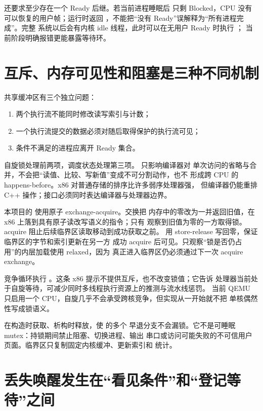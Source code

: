  还要求至少存在一个 Ready 后继。若当前进程睡眠后
只剩 Blocked，CPU 没有可以恢复的用户帧；运行时返回
，不能把“没有 Ready”误解释为“所有进程完成”。完整
系统以后会有内核 idle 线程，此时可以在无用户 Ready 时执行 ；
当前阶段明确报错更能暴露等待环。

\section{互斥、内存可见性和阻塞是三种不同机制}

共享缓冲区有三个独立问题：

\begin{enumerate}[label=\arabic*.]
  \item 两个执行流不能同时修改读写索引与计数；
  \item 一个执行流提交的数据必须对随后取得保护的执行流可见；
  \item 条件不满足的进程应离开 Ready 集合。
\end{enumerate}

自旋锁处理前两项，调度状态处理第三项。 只影响编译器对
单次访问的省略与合并，不会把“读值、比较、写新值”变成不可分割动作，也不
形成跨 CPU 的 happens-before。x86 对普通存储的排序比许多弱序处理器强，
但编译器仍能重排 C++ 操作；接口必须同时表达编译器与处理器边界。

本项目的  使用原子 exchange-acquire。交换把
内存中的零改为一并返回旧值，在 x86 上落到具有原子读改写语义的指令；只有
观察到旧值为零的一方取得锁。acquire 阻止后续临界区读取移动到成功获取之前。
 用 store-release 写回零，保证临界区的字节和索引更新在另一方
成功 acquire 后可见。只观察“锁是否仍占用”的内层加载使用 relaxed，因为
真正进入临界区仍必须通过下一次 acquire exchange。

竞争循环执行 。这条 x86 提示不提供互斥，也不改变锁值；它告诉
处理器当前处于自旋等待，可减少同时多线程执行资源上的推测与流水线惩罚。
当前 QEMU 只启用一个 CPU，自旋几乎不会承受跨核竞争，但实现从一开始就不把
单核偶然性写成锁语义。

 在构造时获取、析构时释放，使  的多个
早退分支不会漏锁。它不是可睡眠 mutex：持锁期间禁止阻塞、切换进程、输出
串口或访问可能失败的不可信用户页面。临界区只复制固定内核缓冲、更新索引和
统计。

\section{丢失唤醒发生在“看见条件”和“登记等待”之间}

